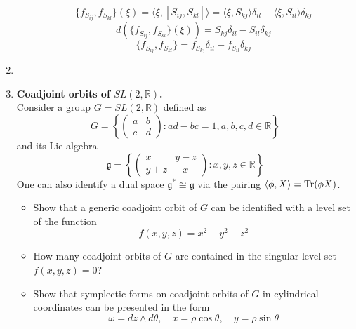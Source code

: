 \documentclass[12pt]{article}
\theoremstyle{definition}
\begin{document}
\begin{enumerate}
\begin{itemize}
\begin{equation}
        \{f_{S_{ij}}, f_{S_{kl}}\}(\xi) = \langle \xi, [S_{ij}, S_{kl}] \rangle = \langle \xi, S_{kj}\rangle \delta_{il}-\langle \xi, S_{il} \rangle \delta_{kj}
    \end{equation}
    \begin{equation}
        d(\{f_{S_{ij}}, f_{S_{kl}}\}(\xi))=S_{kj} \delta_{il}-S_{il} \delta_{kj}
    \end{equation}
    \begin{equation}
        \boxed{\{f_{S_{ij}}, f_{S_{kl}}\} = f_{S_{kj}} \delta_{il}-f_{S_{il}} \delta_{kj}}
    \end{equation}
\end{itemize}
\item
\item \textbf{Coadjoint orbits of $SL(2,\mathbb{R})$.}\\
Consider a group $G=SL(2,\mathbb{R})$ defined as
\begin{equation}
    G=\left\{\begin{pmatrix}
        a & b\\
        c & d
    \end{pmatrix}:ad-bc=1, a,b,c,d\in\mathbb{R}\right\}
\end{equation}
and its Lie algebra
\begin{equation}
    \mathfrak{g}=\left\{\begin{pmatrix}
        x & y-z\\
        y+z & -x
    \end{pmatrix}: x,y,z\in\mathbb{R}\right\}
\end{equation}
One can also identify a dual space $\mathfrak{g}^*\cong\mathfrak{g}$ via the pairing $\braket{\phi,X}=\text{Tr}(\phi X)$.
\begin{itemize}
    \item Show that a generic coadjoint orbit of $G$ can be identified with a level set of the function
    \begin{equation}
        f(x,y,z)=x^2+y^2-z^2
    \end{equation}
    \item How many coadjoint orbits of $G$ are contained in the singular level set $f(x, y, z) = 0$?
    \item Show that symplectic forms on coadjoint orbits of $G$ in cylindrical coordinates can be presented in the form
    \begin{equation}
        \omega=dz\wedge d\theta,\quad x=\rho\cos\theta,\quad y=\rho\sin\theta
    \end{equation}

\end{itemize}
\end{enumerate}
\end{document}
